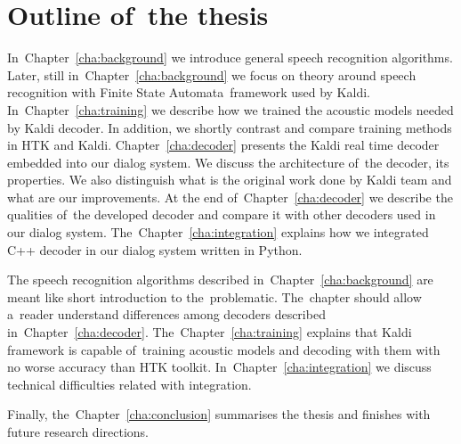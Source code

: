 \section{Outline of~the thesis} 
\label{sec:outline_of_the_thesis}
In~Chapter~\ref{cha:background} we introduce general speech recognition algorithms. Later, still in~Chapter~\ref{cha:background} we focus on theory around speech recognition with Finite State Automata~framework used by Kaldi. In~Chapter~\ref{cha:training} we describe how we trained the acoustic models needed by Kaldi decoder. In addition, we shortly contrast and compare training methods in HTK and Kaldi. Chapter~\ref{cha:decoder} presents the Kaldi real time decoder embedded into our dialog system. We discuss the architecture of~the decoder, its properties. We also distinguish what is the original work done by Kaldi team and what are our improvements. At the end of~Chapter~\ref{cha:decoder} we describe the qualities of~the developed decoder and compare it with other decoders used in our dialog system.
The~Chapter~\ref{cha:integration} explains how we integrated C++ decoder in our dialog system written in Python.
    
The speech recognition algorithms described in~Chapter~\ref{cha:background} are meant like short introduction to the~problematic. The~chapter should allow a~reader understand differences among decoders described in~Chapter~\ref{cha:decoder}. The~Chapter~\ref{cha:training} explains that Kaldi framework is capable of~training acoustic models and decoding with them with no worse accuracy than HTK toolkit. In~Chapter~\ref{cha:integration} we discuss technical difficulties related with integration. 

Finally, the~Chapter~\ref{cha:conclusion} summarises the thesis and finishes with future research directions.

